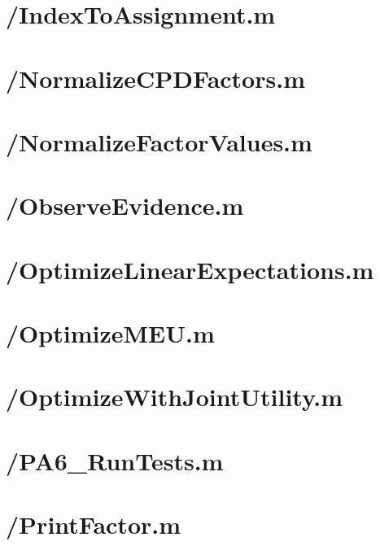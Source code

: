 \documentclass{article}
\begin{document}
\section{/IndexToAssignment.m}

\section{/NormalizeCPDFactors.m}

\section{/NormalizeFactorValues.m}

\section{/ObserveEvidence.m}

\section{/OptimizeLinearExpectations.m}

\section{/OptimizeMEU.m}

\section{/OptimizeWithJointUtility.m}

\section{/PA6\_RunTests.m}

\section{/PrintFactor.m}

\end{document}

